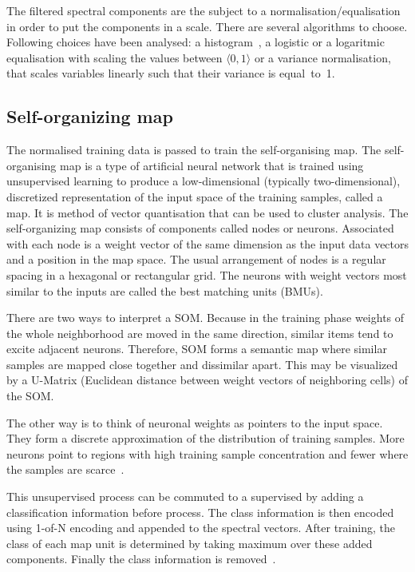 \documentclass[a4paper]{IEEEtran}
\begin{document}
The filtered spectral components are the subject to a normalisation/equalisation
in order to put the components in a scale.
There are several algorithms to choose. Following choices have been analysed:
a histogram~\cite{hist}, a logistic or a logaritmic equalisation
with scaling the values between $ \langle 0, 1 \rangle $ or a variance normalisation,
that scales variables linearly such that their variance is equal~to~1.

\subsection{Self-organizing map}
The normalised training data is passed to train the self-organising map.
The self-organising map is a type of artificial neural network that is
trained using unsupervised learning to produce a low-dimensional 
(typically two-dimensional), discretized representation of the input 
space of the training samples, called a map. It is method of vector 
quantisation that can be used to cluster analysis.
The self-organizing map consists of components called nodes or neurons. 
Associated with each node is a weight vector of the same dimension 
as the input data vectors and a position in the map space.
The usual arrangement of nodes is a regular spacing in a hexagonal or rectangular grid. 
The neurons with weight vectors most similar to the inputs are called 
the best matching units (BMUs).

There are two ways to interpret a SOM. 
Because in the training phase weights of the whole neighborhood are moved in the 
same direction, similar items tend to excite adjacent neurons. Therefore, 
SOM forms a semantic map where similar samples are mapped close together 
and dissimilar apart. This may be visualized by a U-Matrix 
(Euclidean distance between weight vectors of neighboring cells) of the SOM.

The other way is to think of neuronal weights as pointers to the input space. 
They form a discrete approximation of the distribution of training samples.
More neurons point to regions with high training sample concentration and 
fewer where the samples are scarce~\cite{somwiki}.

This unsupervised process can be commuted to a supervised by adding a classification
information before process.
The class information is then encoded using 1-of-N encoding and appended to the 
spectral vectors. After training, the class of each map unit
is determined by taking maximum over these added components.
Finally the class information is removed~\cite{somtoolbox}.
\end{document}
